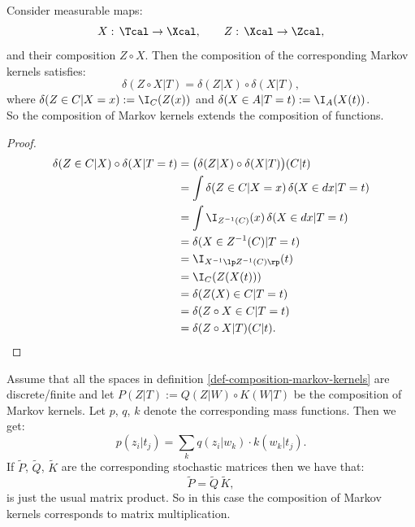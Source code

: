 \begin{Rem}\label{deterministic-mk-composition}
    Consider measurable maps:
    \[ X:\, \Tcal \to \Xcal,\qquad Z:\, \Xcal \to \Zcal, \]
    and their composition $Z \circ X$. 
    Then the composition of the corresponding Markov kernels satisfies:
    \[  \delta(Z\circ X|T)  = \delta(Z|X) \circ \delta(X|T), \]
    where $\delta(Z \in C|X=x) := \I_C(Z(x))$ and $\delta(X \in A|T=t) := \I_A(X(t))$.\\
    So the composition of Markov kernels extends the composition of functions.
    \begin{proof}
        \begin{align*}
            \delta(Z \in C|X) \circ \delta(X|T=t) 
          & = \big(\delta(Z|X) \circ \delta(X|T)\big)(C|t) \\
        & = \int \delta(Z \in C| X=x) \, \delta(X \in dx|T=t)\\
                                             & = \int \I_{Z^{-1}(C)}(x)\, \delta(X \in dx|T=t)\\
                                             & = \delta(X \in Z^{-1}(C)|T=t)\\
                                             & = \I_{X^{-1}\lp Z^{-1}(C)\rp }(t)\\
                                             & = \I_C(Z(X(t))) \\
                                             & = \delta(Z(X) \in C|T=t)\\
                                             & = \delta(Z \circ X \in C|T=t)\\
                                             & = \delta(Z \circ X|T)(C|t).
        \end{align*}
    \end{proof}
\end{Rem}

\begin{Eg}
    Assume that all the spaces in definition \ref{def-composition-markov-kernels} are discrete/finite and let $P(Z|T):=Q(Z|W) \circ K(W|T)$ be the composition of Markov kernels.
    Let $p$, $q$, $k$ denote the corresponding mass functions. Then we get:
    \[ p(z_i|t_j) = \sum_k q(z_i|w_k) \cdot k(w_k|t_j).  \]
    If $\tilde P$, $\tilde Q$, $\tilde K$ are the corresponding stochastic matrices then we have that:
    \[  \tilde P = \tilde Q \, \tilde K,\]
    is just the usual matrix product. So in this case the composition of Markov kernels corresponds to matrix multiplication.
\end{Eg}

